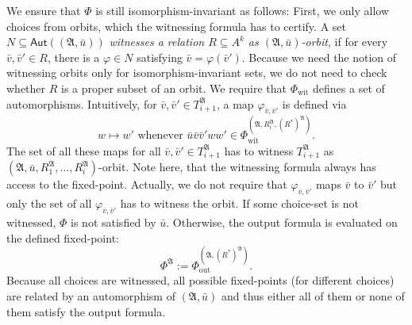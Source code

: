 \documentclass[]{lmcs}
\renewcommand{\phi}{\varphi}
\newcommand{\defining}[1]{\emph{#1}}
\newcommand{\formA}{\Phi}
\newcommand{\autoA}{\phi}
\newcommand{\autGroup}[1]{\mathsf{Aut}(#1)}
\newcommand{\tup}[1]{\bar{#1}}
\newcommand{\Struct}{\mathfrak{A}}
\newcommand{\vertA}{u}
\newcommand{\vertB}{v}
\newcommand{\vertC}{w}
\newcommand{\StructA}{\mathfrak{A}}
\newcommand{\StructVA}{A}
\newcommand{\formOut}{\formA_{\text{out}}}
\newcommand{\formWit}{\formA_{\text{wit}}}
\begin{document}
We ensure that $\formA$ is still isomorphism-invariant as follows:
First, we only allow choices from orbits, which the witnessing formula has to certify.
A set $N \subseteq \autGroup{(\StructA, \tup{\vertA})}$ \defining{witnesses a relation $R \subseteq \StructVA^k$ as $(\StructA, \tup{\vertA})$-orbit},
if for every $\tup{\vertB}, \tup{\vertB}' \in R$,
there is a $\autoA \in N$
satisfying $\tup{\vertB} = \autoA(\tup{\vertB}')$.
Because we need the notion of witnessing orbits only for isomorphism-invariant sets, we do not need to check whether $R$ is a proper subset of an orbit.
We require that $\formWit$ defines a set of automorphisms.
Intuitively, for $\tup{\vertB}, \tup{\vertB}' \in T_{i+1}^\Struct$, a map $\autoA_{\tup{\vertB}, \tup{\vertB}'}$ is defined via
\[ \vertC \mapsto \vertC' \text{ whenever } \tup{\vertA}\tup{\vertB}\tup{\vertB}'\vertC\vertC' \in \formWit^{(\Struct, R_i^\Struct, (R^*)^\Struct)}.\]
The set of all these maps for all $\tup{\vertB}, \tup{\vertB}' \in T_{i+1}^\Struct$
has to witness $T_{i+1}^\Struct$ as $(\Struct, \tup{\vertA}, R_1^\Struct, \dots, R_i^\Struct)$-orbit.
Note here, that the witnessing formula always has access to the fixed-point.
Actually, we do not require that $\autoA_{\tup{\vertB}, \tup{\vertB}'}$ maps $\tup{\vertB}$ to $\tup{\vertB}'$ but only the set of all $\autoA_{\tup{\vertB}, \tup{\vertB}'}$ has to witness the orbit.
If some choice-set is not witnessed, $\formA$ is not satisfied by $\tup{\vertA}$.
Otherwise, the output formula is evaluated on the defined fixed-point: \[\formA^\Struct :=\formOut^{(\Struct, (R^*)^\Struct)}.\]
Because all choices are witnessed, all possible fixed-points (for different choices)
are related by an automorphism of $(\Struct, \tup{\vertA})$
and thus either all of them or none of them satisfy the output formula.
\end{document}
